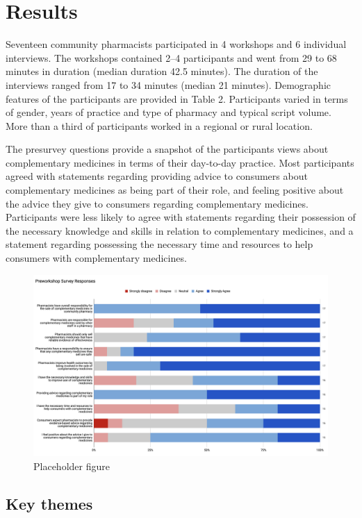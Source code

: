 \documentclass[11pt,a4paper]{article}
\begin{document}
\section{Results}\label{results}

Seventeen community pharmacists participated in 4 workshops and 6
individual interviews. The workshops contained 2--4 participants and
went from 29 to 68 minutes in duration (median duration 42.5 minutes).
The duration of the interviews ranged from 17 to 34 minutes (median 21
minutes). Demographic features of the participants are provided in Table
2. Participants varied in terms of gender, years of practice and type of
pharmacy and typical script volume. More than a third of participants
worked in a regional or rural location.



The presurvey questions provide a snapshot of the participants views
about complementary medicines in terms of their day-to-day practice.
Most participants agreed with statements regarding providing advice to
consumers about complementary medicines as being part of their role, and
feeling positive about the advice they give to consumers regarding
complementary medicines. Participants were less likely to agree with
statements regarding their possession of the necessary knowledge and
skills in relation to complementary medicines, and a statement regarding
possessing the necessary time and resources to help consumers with
complementary medicines.

\begin{figure}
\centering
\includegraphics{fig_tab/presurvey.png}
\caption{Placeholder figure}
\end{figure}

\subsection{Key themes}\label{key-themes}
\end{document}
